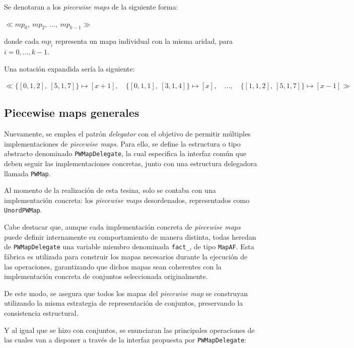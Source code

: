 Se denotaran a los \textit{piecewise maps} de la siguiente forma:

\begin{center}
    $\ll mp_0,\ mp_2,\ \ldots,\ mp_{k-1}\gg$
\end{center}

donde cada $mp_i$ representa un mapa individual con la misma aridad, para $i = 0,\ldots,k-1$.

Una notación expandida sería la siguiente:

\begin{center}
    $\ll\{[0,1,2],\ [5,1,7]\} \mapsto [x+1],\quad \{[0,1,1],\ [3,1,4]\} \mapsto [x],\quad \ldots,\quad \{[1,1,2],\ [5,1,7]\} \mapsto [x-1]\gg$
\end{center}

\subsection{Piecewise maps generales}

Nuevamente, se emplea el patrón \textit{delegator} con el objetivo de permitir múltiples implementaciones de \textit{piecewise maps}. Para ello, se define la estructura o tipo abstracto denominado \texttt{PWMapDelegate}, la cual especifica la interfaz común que deben seguir las implementaciones concretas, junto con una estructura delegadora llamada \texttt{PWMap}.

Al momento de la realización de esta tesina, solo se contaba con una implementación concreta: los \textit{piecewise maps} desordenados, representados como \texttt{UnordPWMap}.

Cabe destacar que, aunque cada implementación concreta de \textit{piecewise maps} puede definir internamente su comportamiento de manera distinta, todas heredan de \texttt{PWMapDelegate} una variable miembro denominada \texttt{fact\_}, de tipo \texttt{MapAF}. Esta fábrica es utilizada para construir los mapas necesarios durante la ejecución de las operaciones, garantizando que dichos mapas sean coherentes con la implementación concreta de conjuntos seleccionada originalmente.

De este modo, se asegura que todos los mapas del \textit{piecewise map} se construyan utilizando la misma estrategia de representación de conjuntos, preservando la consistencia estructural.

Y al igual que se hizo con conjuntos, se enunciaran las principales operaciones de las cuales van a disponer a través de la interfaz propuesta por \texttt{PWMapDelegate}:


